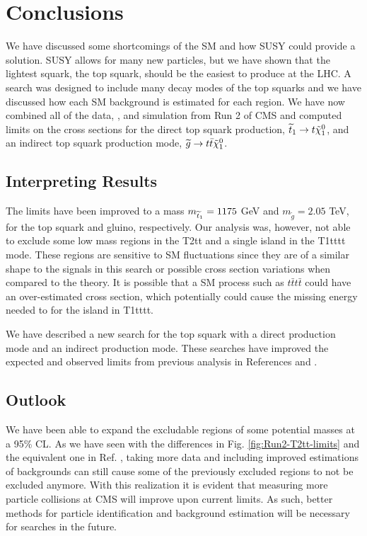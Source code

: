 \chapter{Conclusions}
\label{ch:Conclusions}

We have discussed some shortcomings of the SM and how SUSY could provide a solution. SUSY allows for many new particles, but we have shown that the lightest squark, the top squark, should be the easiest to produce at the LHC. A search was designed to include many decay modes of the top squarks and we have discussed how each SM background is estimated for each region. We have now combined all of the data, \datalumi{}, and simulation from Run 2 of CMS and computed limits on the cross sections for the direct top squark production, $\widetilde{t}_1\rightarrow t\tilde{\chi}^{0}_{1}$, and an indirect top squark production mode, $\widetilde{g}\rightarrow t \bar{t}\tilde{\chi}^{0}_{1}$. 

\section{Interpreting Results}
\label{sec:Interp}

The limits have been improved to a mass $m_{\widetilde{t}_1}=1175$ GeV and $m_{\widetilde{g}}=2.05$ TeV, for the top squark and gluino, respectively. Our analysis was, however, not able to exclude some low mass regions in the T2tt and a single island in the T1tttt mode. These regions are sensitive to SM fluctuations since they are of a similar shape to the signals in this search or possible cross section variations when compared to the theory. It is possible that a SM process such as $t\bar{t}t\bar{t}$ could have an over-estimated cross section, which potentially could cause the missing energy needed to for the island in T1tttt. 

We have described a new search for the top squark with a direct production mode and an indirect production mode. These searches have improved the expected and observed limits from previous analysis in References \cite{sirunyan_search_2017} and \cite{cms_collaboration_search_2018}. 

\section{Outlook}	
\label{sec:outlook}

We have been able to expand the excludable regions of some potential masses at a 95\% CL. As we have seen with the differences in Fig. \ref{fig:Run2-T2tt-limits} and the equivalent one in Ref. \cite{sirunyan_search_2017}, taking more data and including improved estimations of backgrounds can still cause some of the previously excluded regions to not be excluded anymore. With this realization it is evident that measuring more particle collisions at CMS will improve upon current limits. As such, better methods for particle identification and background estimation will be necessary for searches in the future. 

